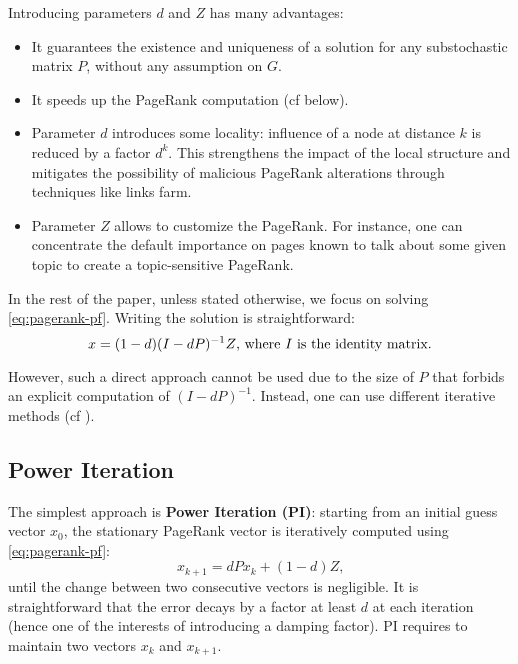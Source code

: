 \documentclass{llncs}
\begin{document}
Introducing parameters $ d $ and $ Z $ has many advantages:
\begin{itemize}
\item It guarantees the existence and uniqueness of a solution for any substochastic matrix $ P $, without any assumption on $ G $.
\item It speeds up the PageRank computation (cf below).
\item Parameter $ d $ introduces some locality: influence of a node at distance $ k $ is reduced by a factor $ d^k $. This strengthens the impact of the local structure and mitigates the possibility of malicious PageRank alterations through techniques like links farm\cite{BM05}.
\item Parameter $ Z $ allows to customize the PageRank. For instance, one can concentrate the default importance on pages known to talk about some given topic to create a topic-sensitive PageRank\cite{HT02}.
\end{itemize}


\label{sec:pagerank}

In the rest of the paper, unless stated otherwise, we focus on solving \eqref{eq:pagerank-pf}. Writing the solution is straightforward:
\begin{equation}
x=(1-d)(I-dP)^{-1}Z\text{, where $ I $ is the identity matrix.}
\end{equation}

However, such a direct approach cannot be used due to the size of $ P $ that forbids an explicit computation of $ (I-dP)^{-1} $. Instead, one can use different iterative methods (cf \cite{LM04}). 

\subsection{Power Iteration}

The simplest approach is \textbf{Power Iteration (PI)}: starting from an initial guess vector $x_0$, the stationary PageRank vector is iteratively computed using \eqref{eq:pagerank-pf}:
\begin{equation}
x_{k+1}=dPx_{k}+(1-d)Z\text{,}
\end{equation}
until the change between two consecutive vectors is negligible. It is straightforward that the error decays by a factor at least $ d $ at each iteration (hence one of the interests of introducing a damping factor). PI requires to maintain two vectors $ x_k $ and $ x_{k+1} $.
\end{document}
